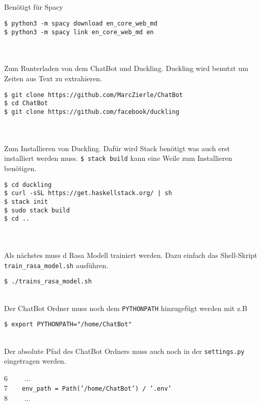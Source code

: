 \\\\\\\\
Benötigt für Spacy
\begin{framed}
	\texttt{\$ python3 -m spacy download en\_core\_web\_md \\
		\$ python3 -m spacy link en\_core\_web\_md en}
\end{framed}
\hfill\\\\
Zum Runterladen von dem ChatBot und Duckling. Duckling wird benutzt um Zeiten aus Text zu extrahieren.
\begin{framed}
	\texttt{\$ git clone https://github.com/MarcZierle/ChatBot \\
		\$ cd ChatBot \\ 
		\$ git clone  https://github.com/facebook/duckling}
\end{framed}
\hfill\\\\
\newpage
Zum Installieren von Duckling. Dafür wird Stack benötigt was auch erst installiert werden muss. \texttt{\$ stack build} kann eine Weile zum Installieren benötigen.\\
\begin{framed}
	\texttt{\$ cd duckling \\
	\$ curl -sSL https://get.haskellstack.org/ | sh \\
	\$ stack init \\
	\$ sudo stack build \\
	\$ cd ..}
\end{framed}
\hfill\\\\


Als nächstes muss d Rasa Modell trainiert werden. Dazu einfach das Shell-Skript \texttt{train\_rasa\_model.sh} ausführen. \\
\begin{framed}
	\texttt{\$ ./trains\_rasa\_model.sh}
\end{framed}
\hfill\\
Der ChatBot Ordner muss noch dem \texttt{PYTHONPATH} hinzugefügt werden mit z.B \\
\begin{framed}
	\texttt{\$ export PYTHONPATH="/home/ChatBot"}
\end{framed}
\hfill\\

Der absolute Pfad des ChatBot Ordners muss auch noch in der \texttt{settings.py} eingetragen werden. \\
\begin{framed}
	6$\qquad$ ...\\
	7$\qquad$\texttt{env\_path = Path('/home/ChatBot') / '.env'}\\
	8$\qquad$ ...
\end{framed}
\hfill\\

